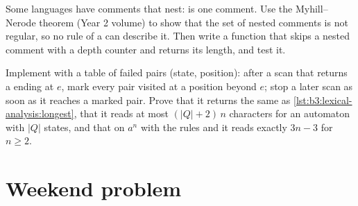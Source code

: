 \begin{exercise}[$\star\star\star$]\label{exo:b3:lexical-analysis:11}
Some languages have comments that nest:  is one comment. Use the Myhill--Nerode theorem (Year 2 volume) to show that the set of nested comments is not regular, so no rule of a  can describe it. Then write a function that skips a nested comment with a depth counter and returns its length, and test it.
\end{exercise}

\begin{exercise}[$\star\star\star$]\label{exo:b3:lexical-analysis:12}
Implement  with a table of failed pairs (state, position): after a scan that returns a  ending at $e$, mark every pair visited at a position beyond $e$; stop a later scan as soon as it reaches a marked pair. Prove that it returns the same  as \cref{lst:b3:lexical-analysis:longest}, that it reads at most $(|Q| + 2)\,n$ characters for an automaton with $|Q|$ states, and that on $a^n$ with the rules  and  it reads exactly $3n - 3$ for $n \ge 2$.
\end{exercise}

\section{Weekend problem}\label{sec:b3:lexical-analysis:problem}

